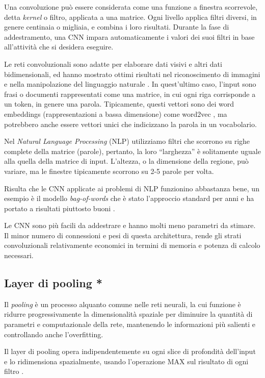 Una convoluzione può essere considerata come una funzione a finestra scorrevole, detta \emph{kernel} o filtro, applicata a una matrice. 
Ogni livello applica filtri diversi, in genere centinaia o migliaia, e combina i loro risultati. 
Durante la fase di addestramento, una CNN impara automaticamente i valori dei suoi filtri in base all'attività che si desidera eseguire. 

Le reti convoluzionali sono adatte per elaborare dati visivi e altri dati bidimensionali, ed hanno mostrato ottimi risultati nel riconoscimento di immagini e nella manipolazione del linguaggio naturale \cite{manning1999foundations}.
In quest'ultimo caso, l'input sono frasi o documenti rappresentati come una matrice, in cui ogni riga corrisponde a un token, in genere una parola. Tipicamente, questi vettori sono dei word embeddings (rappresentazioni a bassa dimensione) come word2vec \cite{mikolov2013distributed}, ma potrebbero anche essere vettori unici che indicizzano la parola in un vocabolario. 

Nel \emph{Natural Language Processing} (NLP) utilizziamo filtri che scorrono su righe complete della matrice (parole), pertanto, la loro ``larghezza'' è solitamente uguale alla quella della matrice di input. L'altezza, o la dimensione della regione, può variare, ma le finestre tipicamente scorrono su 2-5 parole per volta. 

Risulta che le CNN applicate ai problemi di NLP funzionino abbastanza bene, un esempio è il modello \emph{bag-of-words} che è stato l'approccio standard per anni e ha portato a risultati piuttosto buoni \cite{wallach2006topic}.

Le CNN sono più facili da addestrare e hanno molti meno parametri da stimare. 
Il minor numero di connessioni e pesi di questa architettura, rende gli strati convoluzionali relativamente economici in termini di memoria e potenza di calcolo necessari.

\subsection{Layer di pooling *}
\label{subsec:maxpool}

Il \emph{pooling} è un processo alquanto comune nelle reti neurali, la cui funzione è ridurre progressivamente la dimensionalità spaziale per diminuire la quantità di parametri e computazionale della rete, mantenendo le informazioni più salienti e controllando anche l'overfitting.

Il layer di pooling opera indipendentemente su ogni slice di profondità dell'input e lo ridimensiona spazialmente, usando l'operazione MAX sul risultato di ogni filtro \cite{karpathy2016cs231n}. 

